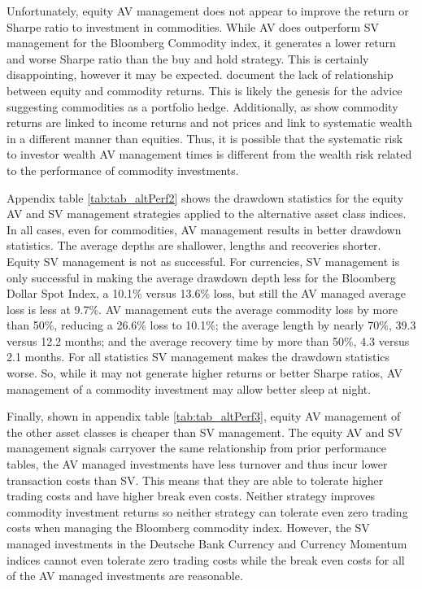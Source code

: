 Unfortunately, equity AV management does not appear to improve the return or Sharpe ratio to investment in commodities. While AV does outperform SV management for the Bloomberg Commodity index, it generates a lower return and worse Sharpe ratio than the buy and hold strategy. This is certainly disappointing, however it may be expected. \citet{gorton_facts_2006,buyuksahin_commodities_2008,NBERw21243} document the lack of relationship between equity and commodity returns. This is likely the genesis for the advice suggesting commodities as a portfolio hedge. Additionally, as \citet{erb_conquering_nodate} show commodity returns are linked to income returns and not prices and link to systematic wealth in a different manner than equities. Thus, it is possible that the systematic risk to investor wealth AV management times is different from the wealth risk related to the performance of commodity investments.


Appendix table \ref{tab:tab_altPerf2} shows the drawdown statistics for the equity AV and SV management strategies applied to the alternative asset class indices. In all cases, even for commodities, AV management results in better drawdown statistics. The average depths are shallower, lengths and recoveries shorter. Equity SV management is not as successful. For currencies, SV management is only successful in making the average drawdown depth less for the Bloomberg Dollar Spot Index, a 10.1\% versus 13.6\% loss, but still the AV managed average loss is less at 9.7\%. AV management cuts the average commodity loss by more than 50\%, reducing a 26.6\% loss to 10.1\%; the average length by nearly 70\%, 39.3 versus 12.2 months; and the average recovery time by more than 50\%, 4.3 versus 2.1 months. For all statistics SV management makes the drawdown statistics worse. So, while it may not generate higher returns or better Sharpe ratios, AV management of a commodity investment may allow better sleep at night.


Finally, shown in appendix table \ref{tab:tab_altPerf3}, equity AV management of the other asset classes is cheaper than SV management. The equity AV and SV management signals carryover the same relationship from prior performance tables, the AV managed investments have less turnover and thus incur lower transaction costs than SV. This means that they are able to tolerate higher trading costs and have higher break even costs. Neither strategy improves commodity investment returns so neither strategy can tolerate even zero trading costs when managing the Bloomberg commodity index. However, the SV managed investments in the Deutsche Bank Currency and Currency Momentum indices cannot even tolerate zero trading costs while the break even costs for all of the AV managed investments are reasonable.

